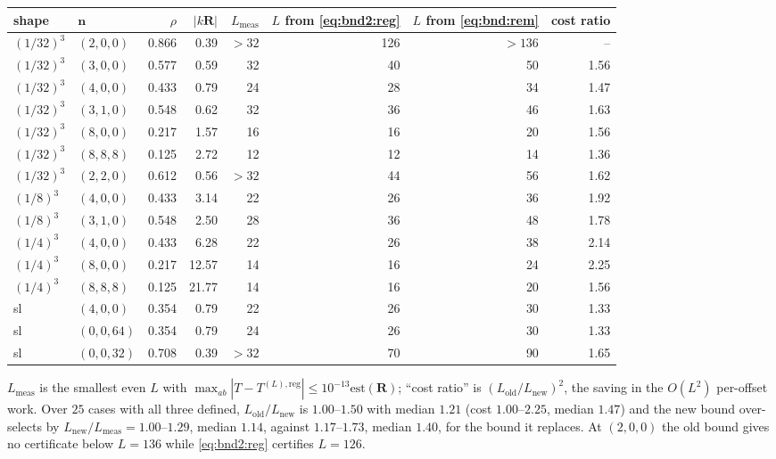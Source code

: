 \begin{center}\footnotesize
\begin{tabular}{@{}llrrrrrr@{}}
\toprule
shape & $\mathbf{n}$ & $\rho$ & $|k\mathbf{R}|$ & $L_{\mathrm{meas}}$ &
$L$ from \eqref{eq:bnd2:reg} & $L$ from \eqref{eq:bnd:rem} & cost ratio\\
\midrule
$(1/32)^3$ & $(2,0,0)$  & 0.866 & 0.39  & $>32$ & 126 & $>136$ & --\\
$(1/32)^3$ & $(3,0,0)$  & 0.577 & 0.59  & 32 & 40 & 50 & 1.56\\
$(1/32)^3$ & $(4,0,0)$  & 0.433 & 0.79  & 24 & 28 & 34 & 1.47\\
$(1/32)^3$ & $(3,1,0)$  & 0.548 & 0.62  & 32 & 36 & 46 & 1.63\\
$(1/32)^3$ & $(8,0,0)$  & 0.217 & 1.57  & 16 & 16 & 20 & 1.56\\
$(1/32)^3$ & $(8,8,8)$  & 0.125 & 2.72  & 12 & 12 & 14 & 1.36\\
$(1/32)^3$ & $(2,2,0)$  & 0.612 & 0.56  & $>32$ & 44 & 56 & 1.62\\
$(1/8)^3$  & $(4,0,0)$  & 0.433 & 3.14  & 22 & 26 & 36 & 1.92\\
$(1/8)^3$  & $(3,1,0)$  & 0.548 & 2.50  & 28 & 36 & 48 & 1.78\\
$(1/4)^3$  & $(4,0,0)$  & 0.433 & 6.28  & 22 & 26 & 38 & 2.14\\
$(1/4)^3$  & $(8,0,0)$  & 0.217 & 12.57 & 14 & 16 & 24 & 2.25\\
$(1/4)^3$  & $(8,8,8)$  & 0.125 & 21.77 & 14 & 16 & 20 & 1.56\\
sl         & $(4,0,0)$  & 0.354 & 0.79  & 22 & 26 & 30 & 1.33\\
sl         & $(0,0,64)$ & 0.354 & 0.79  & 24 & 26 & 30 & 1.33\\
sl         & $(0,0,32)$ & 0.708 & 0.39  & $>32$ & 70 & 90 & 1.65\\
\bottomrule
\end{tabular}
\end{center}

\noindent
$L_{\mathrm{meas}}$ is the smallest even $L$ with
$\max_{ab}|T-T^{(L),\mathrm{reg}}| \le 10^{-13}\mathrm{est}(\mathbf{R})$; ``cost ratio'' is
$(L_{\mathrm{old}}/L_{\mathrm{new}})^2$, the saving in the $O(L^2)$ per-offset work. Over
$25$ cases with all three defined, $L_{\mathrm{old}}/L_{\mathrm{new}}$ is $1.00$--$1.50$
with median $1.21$ (cost $1.00$--$2.25$, median $1.47$) and the new bound over-selects by
$L_{\mathrm{new}}/L_{\mathrm{meas}} = 1.00$--$1.29$, median $1.14$, against
$1.17$--$1.73$, median $1.40$, for the bound it replaces. At $(2,0,0)$ the old bound gives
no certificate below $L = 136$ while \eqref{eq:bnd2:reg} certifies $L = 126$.

